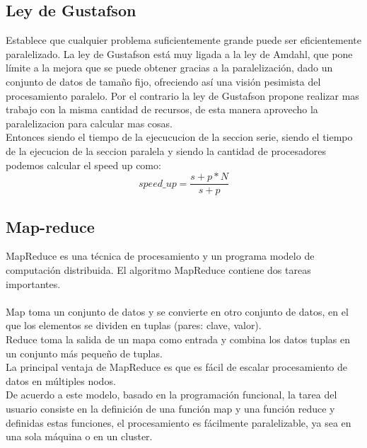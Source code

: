 \subsection{Ley de Gustafson}

Establece que cualquier problema suficientemente grande puede ser eficientemente
paralelizado. La ley de Gustafson está muy ligada a la ley de Amdahl, que pone
límite a la mejora que se puede obtener gracias a la paralelización, dado un
conjunto de datos de tamaño fijo, ofreciendo así una visión pesimista del
procesamiento paralelo. Por el contrario la ley de Gustafson  propone realizar
mas trabajo con la misma cantidad de recursos, de esta manera aprovecho la
paralelizacion para calcular mas cosas.\\

Entonces siendo  el tiempo de la ejecucucion de la seccion serie, siendo
 el tiempo de la ejecucion de la seccion paralela y siendo  la
cantidad de procesadores podemos calcular el speed up como:
\begin{equation}
    speed\_up = \dfrac{s+p*N}{s+p}
\end{equation}

\subsection{Map-reduce}

MapReduce es una técnica de procesamiento y un programa modelo de computación
distribuida. El algoritmo MapReduce contiene dos tareas importantes.\\\\
Map toma un conjunto de datos y se convierte en otro conjunto de datos, en el
que los elementos se dividen en tuplas (pares: clave, valor).\\

Reduce toma la salida de un mapa como entrada y combina los datos tuplas en un
conjunto más pequeño de tuplas.\\

La principal ventaja de MapReduce es que es fácil de escalar procesamiento de
datos en múltiples nodos.\\

De acuerdo a este modelo, basado en la programación funcional, la tarea del
usuario consiste en la definición de una función map y una función reduce y
definidas estas funciones, el procesamiento es fácilmente paralelizable, ya sea
en una sola máquina o en un cluster.\\


